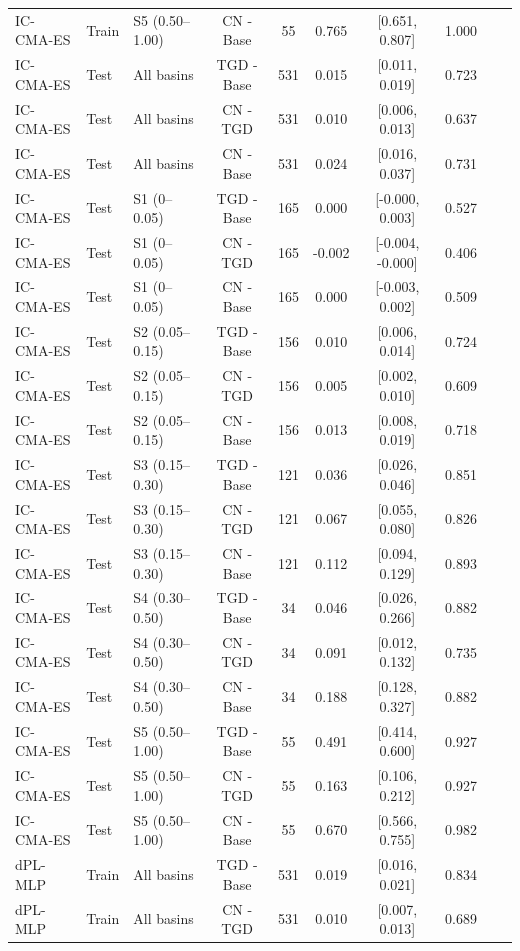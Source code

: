 \begin{table}[t]
\begin{threeparttable}
\begin{tabular}{lllccccccc}
IC-CMA-ES & Train & S5 (0.50–1.00) & CN - Base & 55 & 0.765 & [0.651, 0.807] & 1.000 \\
IC-CMA-ES & Test & All basins & TGD - Base & 531 & 0.015 & [0.011, 0.019] & 0.723 \\
IC-CMA-ES & Test & All basins & CN - TGD & 531 & 0.010 & [0.006, 0.013] & 0.637 \\
IC-CMA-ES & Test & All basins & CN - Base & 531 & 0.024 & [0.016, 0.037] & 0.731 \\
IC-CMA-ES & Test & S1 (0–0.05) & TGD - Base & 165 & 0.000 & [-0.000, 0.003] & 0.527 \\
IC-CMA-ES & Test & S1 (0–0.05) & CN - TGD & 165 & -0.002 & [-0.004, -0.000] & 0.406 \\
IC-CMA-ES & Test & S1 (0–0.05) & CN - Base & 165 & 0.000 & [-0.003, 0.002] & 0.509 \\
IC-CMA-ES & Test & S2 (0.05–0.15) & TGD - Base & 156 & 0.010 & [0.006, 0.014] & 0.724 \\
IC-CMA-ES & Test & S2 (0.05–0.15) & CN - TGD & 156 & 0.005 & [0.002, 0.010] & 0.609 \\
IC-CMA-ES & Test & S2 (0.05–0.15) & CN - Base & 156 & 0.013 & [0.008, 0.019] & 0.718 \\
IC-CMA-ES & Test & S3 (0.15–0.30) & TGD - Base & 121 & 0.036 & [0.026, 0.046] & 0.851 \\
IC-CMA-ES & Test & S3 (0.15–0.30) & CN - TGD & 121 & 0.067 & [0.055, 0.080] & 0.826 \\
IC-CMA-ES & Test & S3 (0.15–0.30) & CN - Base & 121 & 0.112 & [0.094, 0.129] & 0.893 \\
IC-CMA-ES & Test & S4 (0.30–0.50) & TGD - Base & 34 & 0.046 & [0.026, 0.266] & 0.882 \\
IC-CMA-ES & Test & S4 (0.30–0.50) & CN - TGD & 34 & 0.091 & [0.012, 0.132] & 0.735 \\
IC-CMA-ES & Test & S4 (0.30–0.50) & CN - Base & 34 & 0.188 & [0.128, 0.327] & 0.882 \\
IC-CMA-ES & Test & S5 (0.50–1.00) & TGD - Base & 55 & 0.491 & [0.414, 0.600] & 0.927 \\
IC-CMA-ES & Test & S5 (0.50–1.00) & CN - TGD & 55 & 0.163 & [0.106, 0.212] & 0.927 \\
IC-CMA-ES & Test & S5 (0.50–1.00) & CN - Base & 55 & 0.670 & [0.566, 0.755] & 0.982 \\
dPL-MLP & Train & All basins & TGD - Base & 531 & 0.019 & [0.016, 0.021] & 0.834 \\
dPL-MLP & Train & All basins & CN - TGD & 531 & 0.010 & [0.007, 0.013] & 0.689 \\

\end{tabular}
\end{threeparttable}
\end{table}
